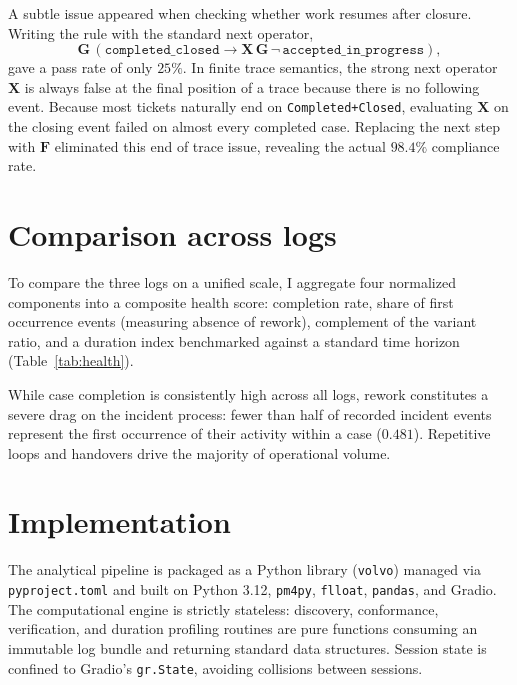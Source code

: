 \documentclass[12pt,a4paper]{article}
\newcommand{\act}[1]{\texttt{#1}}
\begin{document}
A subtle issue appeared when checking whether work resumes after closure. Writing the rule with the standard next operator,
\[
  \mathbf{G}\,(\texttt{completed\_closed} \rightarrow \mathbf{X}\,\mathbf{G}\,\neg\,\texttt{accepted\_in\_progress}),
\]
gave a pass rate of only $25\%$. In finite trace semantics, the strong next operator $\mathbf{X}$ is always false at the final position of a trace because there is no following event. Because most tickets naturally end on \act{Completed+Closed}, evaluating $\mathbf{X}$ on the closing event failed on almost every completed case. Replacing the next step with $\mathbf{F}$ eliminated this end of trace issue, revealing the actual $98.4\%$ compliance rate.

\section{Comparison across logs}\label{sec:health}

To compare the three logs on a unified scale, I aggregate four normalized components into a composite health score: completion rate, share of first occurrence events (measuring absence of rework), complement of the variant ratio, and a duration index benchmarked against a standard time horizon (Table~\ref{tab:health}).

\begin{table}[htbp]
\centering
\small

\caption{Composite health scores and metric components across the three logs.}
\label{tab:health}
\end{table}

While case completion is consistently high across all logs, rework constitutes a severe drag on the incident process: fewer than half of recorded incident events represent the first occurrence of their activity within a case ($0.481$). Repetitive loops and handovers drive the majority of operational volume.

\section{Implementation}\label{sec:architecture}

The analytical pipeline is packaged as a Python library (\texttt{volvo}) managed via \texttt{pyproject.toml} and built on Python 3.12, \texttt{pm4py}, \texttt{flloat}, \texttt{pandas}, and Gradio. The computational engine is strictly stateless: discovery, conformance, verification, and duration profiling routines are pure functions consuming an immutable log bundle and returning standard data structures. Session state is confined to Gradio's \texttt{gr.State}, avoiding collisions between sessions.
\end{document}
